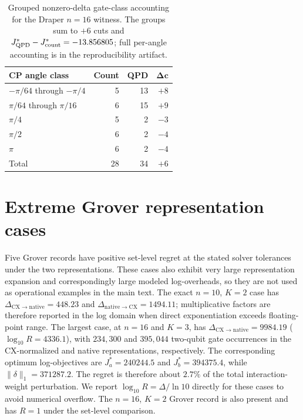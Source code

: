 \documentclass[
  aps,
  pra,
  reprint,
  amsmath,
  amssymb,
  longbibliography,
  nofootinbib,
  floatfix
]{revtex4-2}
\theoremstyle{plain}
\newcommand{\tabfit}[1]{{\footnotesize #1}}
\begin{document}
\begin{table}[tbp]
\centering
\caption{Grouped nonzero-delta gate-class accounting for the Draper $n=16$ witness. The groups sum to $+6$ cuts and $J_{\rm QPD}^*-J_{\rm count}^*=-13.856805$; full per-angle accounting is in the reproducibility artifact.}
\label{tab:e6-draper}
\tabfit{%
\begin{tabular*}{\columnwidth}{@{\extracolsep{\fill}}lrrr@{}}
\toprule
\textbf{CP angle class} & \textbf{Count} & \textbf{QPD} & $\boldsymbol{\Delta c}$\\
\midrule
$-\pi/64$ through $-\pi/4$ & 5 & 13 & $+8$\\
$\pi/64$ through $\pi/16$ & 6 & 15 & $+9$\\
$\pi/4$ & 5 & 2 & $-3$\\
$\pi/2$ & 6 & 2 & $-4$\\
$\pi$ & 6 & 2 & $-4$\\
\midrule
Total & 28 & 34 & $+6$\\
\bottomrule
\end{tabular*}
}
\end{table}

\section{Extreme Grover representation cases}
\label{app:grover}

Five Grover records have positive set-level regret at the stated solver tolerances under the two representations. These cases also exhibit very large representation expansion and correspondingly large modeled log-overheads, so they are not used as operational examples in the main text. The exact $n=10$, $K=2$ case has $\Delta_{\mathrm{CX}\to\mathrm{native}}=448.23$ and $\Delta_{\mathrm{native}\to\mathrm{CX}}=1494.11$; multiplicative factors are therefore reported in the log domain when direct exponentiation exceeds floating-point range. The largest case, at $n=16$ and $K=3$, has $\Delta_{\mathrm{CX}\to\mathrm{native}}=9984.19$ ($\log_{10}R=4336.1$), with $234{,}300$ and $395{,}044$ two-qubit gate occurrences in the CX-normalized and native representations, respectively. The corresponding optimum log-objectives are $J_a^*=240244.5$ and $J_b^*=394375.4$, while $\|\delta\|_1=371287.2$. The regret is therefore about $2.7\%$ of the total interaction-weight perturbation. We report $\log_{10}R=\Delta/\ln 10$ directly for these cases to avoid numerical overflow. The $n=16$, $K=2$ Grover record is also present and has $R=1$ under the set-level comparison.
\end{document}
